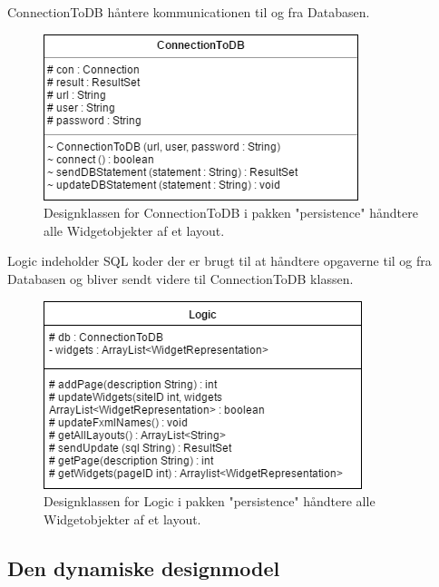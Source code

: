 ConnectionToDB håntere kommunicationen til og fra Databasen.
        \begin{figure}[H]
      \includegraphics[width=\linewidth]{elaborationsdokumentet/figurer/design/designklasser/Designklasse-ConnectionToDB.png}
      \caption{Designklassen for ConnectionToDB i pakken "persistence" håndtere alle Widgetobjekter af et layout.}
      \label{Designklasse-ConnectionToDB}
  \end{figure}
  
Logic indeholder SQL koder der er brugt til at håndtere opgaverne til og fra Databasen og bliver sendt videre til ConnectionToDB klassen.
          \begin{figure}[H]  \includegraphics[width=\linewidth]{elaborationsdokumentet/figurer/design/designklasser/Designklasse-Logic.png}
      \caption{Designklassen for Logic i pakken "persistence" håndtere alle Widgetobjekter af et layout.}
      \label{Designklasse-Logic}
  \end{figure}

\FloatBarrier
\onecolumn



\subsection{Den dynamiske designmodel} \label{Dynamisk designmodel}


